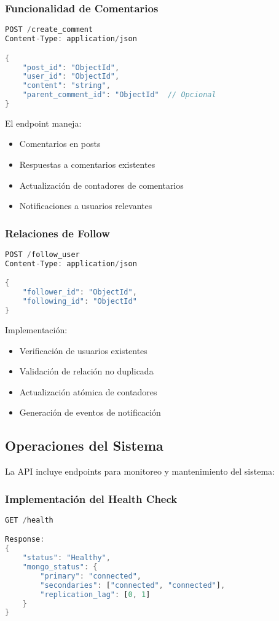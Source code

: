 \documentclass[12pt,letterpaper]{article}
\begin{document}
\subsubsection{Funcionalidad de Comentarios}
\begin{lstlisting}[language=rust]
POST /create_comment
Content-Type: application/json

{
    "post_id": "ObjectId",
    "user_id": "ObjectId",
    "content": "string",
    "parent_comment_id": "ObjectId"  // Opcional
}
\end{lstlisting}

El endpoint maneja:
\begin{itemize}
    \item Comentarios en posts
    \item Respuestas a comentarios existentes
    \item Actualización de contadores de comentarios
    \item Notificaciones a usuarios relevantes
\end{itemize}

\subsubsection{Relaciones de Follow}
\begin{lstlisting}[language=rust]
POST /follow_user
Content-Type: application/json

{
    "follower_id": "ObjectId",
    "following_id": "ObjectId"
}
\end{lstlisting}

Implementación:
\begin{itemize}
    \item Verificación de usuarios existentes
    \item Validación de relación no duplicada
    \item Actualización atómica de contadores
    \item Generación de eventos de notificación
\end{itemize}

\subsection{Operaciones del Sistema}
La API incluye endpoints para monitoreo y mantenimiento del sistema:

\subsubsection{Implementación del Health Check}
\begin{lstlisting}[language=rust]
GET /health

Response:
{
    "status": "Healthy",
    "mongo_status": {
        "primary": "connected",
        "secondaries": ["connected", "connected"],
        "replication_lag": [0, 1]
    }
}
\end{lstlisting}
\end{document}
